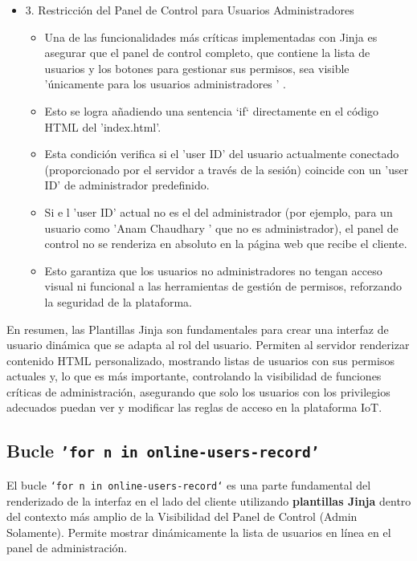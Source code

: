 \documentclass{report}
\begin{document}
\begin{itemize}
    \item 3. Restricción del Panel de Control para Usuarios Administradores
    \begin{itemize}
        \item Una de las funcionalidades más críticas implementadas con Jinja es asegurar que  el panel de control completo, que contiene la lista de 
        usuarios y los botones para gestionar sus permisos, sea visible  'únicamente para los usuarios administradores ' .
        \item Esto se logra añadiendo una  sentencia `if` directamente en el código HTML  del 'index.html'.
        \item Esta condición verifica si el 'user ID' del usuario actualmente conectado (proporcionado por el servidor a través de la sesión) coincide 
        con un 'user ID' de administrador predefinido.
        \item Si e    l 'user ID' actual no es el del administrador (por ejemplo, para un usuario como  'Anam Chaudhary ' que no es administrador), el
         panel de control  no se renderiza en absoluto  en la página web que recibe el cliente.
        \item Esto garantiza que los usuarios no administradores no tengan acceso visual ni funcional a las herramientas de gestión de permisos, 
        reforzando la seguridad de la plataforma.
    \end{itemize}
\end{itemize}

En resumen, las Plantillas Jinja son fundamentales para crear una interfaz de usuario dinámica que se adapta al rol del usuario. Permiten al servidor 
renderizar contenido HTML personalizado, mostrando listas de usuarios con sus permisos actuales y, lo que es más importante, controlando la visibilidad 
de funciones críticas de administración, asegurando que solo los usuarios con los privilegios adecuados puedan ver y modificar las reglas de acceso en 
la plataforma IoT.

\subsection{Bucle \texttt{'for n in online-users-record'}}
El bucle \texttt{`for n in online-users-record`} es una parte fundamental del renderizado de la interfaz en el lado del cliente utilizando 
\textbf{plantillas Jinja} dentro del contexto más amplio de la Visibilidad del Panel de Control (Admin Solamente). Permite mostrar dinámicamente 
la lista de usuarios en línea en el panel de administración.
\end{document}
